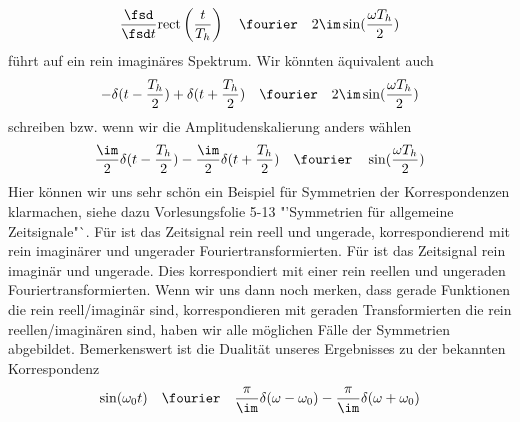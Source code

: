 \begin{Loesung}
\begin{equation}
  \frac{\fsd}{\fsd t} \mathrm{rect}\left(\frac{t}{T_h}\right) \quad\fourier\quad
  2\im\sin (\frac{\omega T_h}{2})
\end{equation}
führt auf ein rein imaginäres Spektrum.
Wir könnten äquivalent auch
\begin{equation}
\label{eq:04ADD03866_Sym1}
- \delta(t-\frac{T_h}{2}) + \delta(t+\frac{T_h}{2})  \quad\fourier\quad
2\im\sin (\frac{\omega T_h}{2})
\end{equation}
schreiben bzw. wenn wir die Amplitudenskalierung anders wählen
\begin{equation}
\label{eq:04ADD03866_Sym2}
\frac{\im}{2}\delta(t-\frac{T_h}{2}) - \frac{\im}{2}\delta(t+\frac{T_h}{2})\quad\fourier\quad
\sin(\frac{\omega T_h}{2})
\end{equation}
Hier können wir uns sehr schön ein Beispiel für Symmetrien der Korrespondenzen
klarmachen, siehe dazu Vorlesungsfolie 5-13 "'Symmetrien für allgemeine Zeitsignale"`.
%
Für  ist das Zeitsignal rein reell und ungerade, korrespondierend
mit rein imaginärer und ungerader Fouriertransformierten.
Für  ist das Zeitsignal rein imaginär und ungerade.
Dies korrespondiert mit einer rein reellen und ungeraden Fouriertransformierten.
Wenn wir uns dann noch merken, dass gerade Funktionen die rein reell/imaginär sind,
korrespondieren mit geraden Transformierten die rein reellen/imaginären sind,
haben wir alle möglichen Fälle der Symmetrien abgebildet.
Bemerkenswert ist die Dualität unseres Ergebnisses zu der bekannten Korrespondenz
\begin{equation}
\sin(\omega_0 t) \quad \fourier \quad \frac{\pi}{\im} \delta(\omega -\omega_0) - \frac{\pi}{\im} \delta(\omega + \omega_0)
\end{equation}
\end{Loesung}
















\newpage
